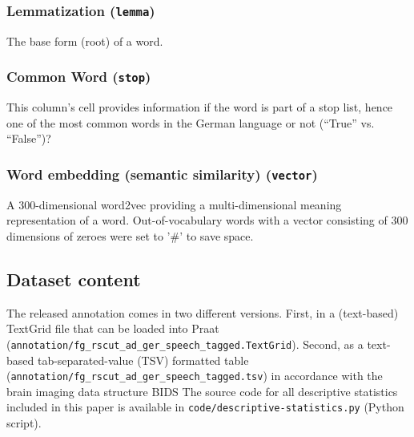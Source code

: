 \documentclass[10pt,a4paper,onecolumn]{article}
\begin{document}
\subsubsection*{Lemmatization (\texttt{lemma})}
The base form (root) of a word.

\subsubsection*{Common Word (\texttt{stop})}
This column's cell provides information if the word is part of a stop list, hence one of the most common words in the German language or not (``True'' vs. ``False'')?

\subsubsection*{Word embedding (semantic similarity) (\texttt{vector})}
A 300-dimensional word2vec providing a multi-dimensional meaning representation of a word.
Out-of-vocabulary words with a vector consisting of 300 dimensions of zeroes were set to '\#' to save space.


\subsection*{Dataset content}
The released annotation comes in two different versions. First, in a (text-based) TextGrid file that can be loaded into Praat (\texttt{annotation/fg\_rscut\_ad\_ger\_speech\_tagged.TextGrid}).
Second, as a text-based tab-separated-value (TSV) formatted table  (\texttt{annotation/fg\_rscut\_ad\_ger\_speech\_tagged.tsv}) in accordance with the brain imaging data structure BIDS \citep{gorgolewski2016bids}
The source code for all descriptive statistics included in this paper is available in \texttt{code/descriptive-statistics.py} (Python script).
\end{document}
